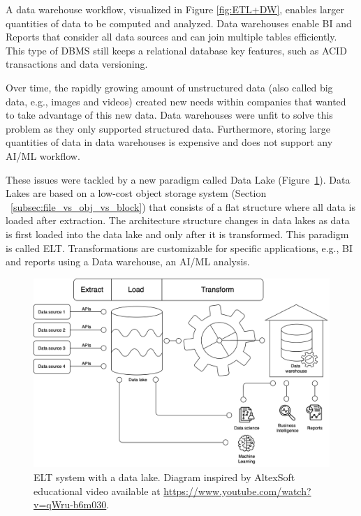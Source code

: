 A data warehouse workflow, visualized in Figure \ref{fig:ETL+DW}, enables larger quantities of data to be computed and analyzed. Data warehouses enable \gls{BI} and Reports that consider all data sources and can join multiple tables efficiently. This type of \gls{DBMS} still keeps a relational database key features, such as \gls{ACID} transactions and data versioning.

Over time, the rapidly growing amount of unstructured data (also called big data, e.g., images and videos) created new needs within companies that wanted to take advantage of this new data. Data warehouses were unfit to solve this problem as they only supported structured data. Furthermore, storing large quantities of data in data warehouses is expensive and does not support any \gls{AI}/\gls{ML} workflow.

These issues were tackled by a new paradigm called Data Lake (Figure~\ref{fig:ELT+DL}). Data Lakes are based on a low-cost object storage system (Section ~\ref{subsec:file_vs_obj_vs_block}) that consists of a flat structure where all data is loaded after extraction. The architecture structure changes in data lakes as data is first loaded into the data lake and only after it is transformed. This paradigm is called \gls{ELT}. Transformations are customizable for specific applications, e.g., \gls{BI} and reports using a Data warehouse, an \gls{AI}/\gls{ML} analysis.

\begin{figure}[!ht]
    \begin{center}
      \includegraphics[width=\textwidth]{figures/2-background/DeltaLake_evolution-ELT+DL.png}
    \end{center}
    \caption[ELT system with a data lake]{\gls{ELT} system with a data lake. Diagram inspired by AltexSoft educational video available at \url{https://www.youtube.com/watch?v=qWru-b6m030}.}
    \label{fig:ELT+DL}
\end{figure}

